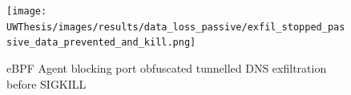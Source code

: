 \documentclass [11pt, proquest] {uwthesis}[2020/02/24]
\begin{document}
\begin{figure}[H]
  \centering
  \texttt{[image: UWThesis/images/results/data\_loss\_passive/exfil\_stopped\_passive\_data\_prevented\_and\_kill.png]}
\caption{eBPF Agent blocking port obfuscated tunnelled DNS exfiltration before SIGKILL}
  \label{fig:data_loss_prev}
\end{figure}

\end{document}
